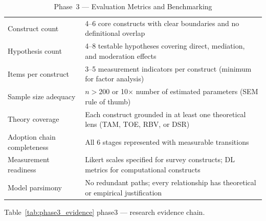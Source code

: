 \begin{xltabular}{\textwidth}{@{} p{0.18\textwidth} X @{}}
\caption{Phase~3 --- Evaluation Metrics and Benchmarking}
\label{tab:phase3_benchmark}\\
\toprule
{} &  \\
\midrule
\endfirsthead
\endhead
\bottomrule
\endlastfoot
Construct count               & 4--6 core constructs with clear boundaries and no definitional overlap \\
\addlinespace
Hypothesis count              & 4--8 testable hypotheses covering direct, mediation, and moderation effects \\
\addlinespace
Items per construct           & 3--5 measurement indicators per construct (minimum for factor analysis) \\
\addlinespace
Sample size adequacy          & $n > 200$ or 10$\times$ number of estimated parameters (SEM rule of thumb) \\
\addlinespace
Theory coverage               & Each construct grounded in at least one theoretical lens (TAM, TOE, RBV, or DSR) \\
\addlinespace
Adoption chain completeness   & All 6 stages represented with measurable transitions \\
\addlinespace
Measurement readiness         & Likert scales specified for survey constructs; DL metrics for computational constructs \\
\addlinespace
Model parsimony               & No redundant paths; every relationship has theoretical or empirical justification \\
\end{xltabular}
\endgroup

\vspace{1.5em}

\begingroup\singlespacing\tablefontsize\tablestripes
\noindent Table~\ref{tab:phase3_evidence} phase3 --- research evidence chain.

